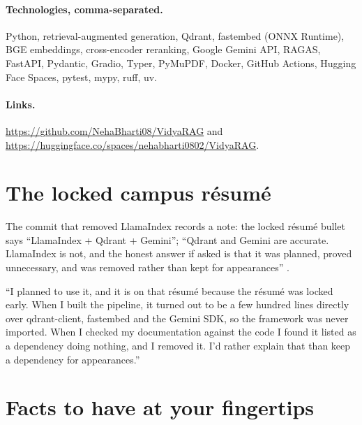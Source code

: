 \paragraph{Technologies, comma-separated.} Python, retrieval-augmented generation, Qdrant, fastembed (ONNX Runtime), BGE embeddings, cross-encoder reranking, Google Gemini API, RAGAS, FastAPI, Pydantic, Gradio, Typer, PyMuPDF, Docker, GitHub Actions, Hugging Face Spaces, pytest, mypy, ruff, uv.

\paragraph{Links.} \url{https://github.com/NehaBharti08/VidyaRAG} and \url{https://huggingface.co/spaces/nehabharti0802/VidyaRAG}.

\section{The locked campus résumé}

The commit that removed LlamaIndex records a note: the locked résumé bullet says \enquote{LlamaIndex + Qdrant + Gemini}; \enquote{Qdrant and Gemini are accurate. LlamaIndex is not, and the honest answer if asked is that it was planned, proved unnecessary, and was removed rather than kept for appearances} .

\begin{interview}
\enquote{I planned to use it, and it is on that résumé because the résumé was locked early. When I built the pipeline, it turned out to be a few hundred lines directly over qdrant-client, fastembed and the Gemini SDK, so the framework was never imported. When I checked my documentation against the code I found it listed as a dependency doing nothing, and I removed it. I'd rather explain that than keep a dependency for appearances.}
\end{interview}

\section{Facts to have at your fingertips}

